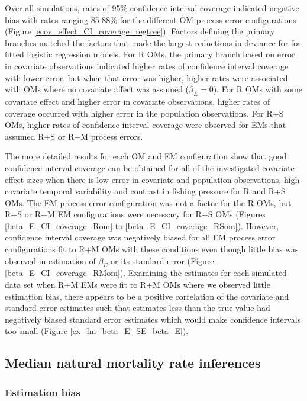 \documentclass[
  12pt,
]{article}
\begin{document}
Over all simulations, rates of 95\% confidence interval coverage indicated negative bias with rates ranging 85-88\% for the different OM process error configurations (Figure \ref{ecov_effect_CI_coverage_regtree}). Factors defining the primary branches matched the factors that made the largest reductions in deviance for for fitted logistic regression models. For R OMs, the primary branch based on error in covariate observations indicated higher rates of confidence interval coverage with lower error, but when that error was higher, higher rates were associated with OMs where no covariate affect was assumed (\(\beta_E = 0\)). For R OMs with some covariate effect and higher error in covariate observations, higher rates of coverage occurred with higher error in the population observations. For R+S OMs, higher rates of confidence interval coverage were observed for EMs that assumed R+S or R+M process errors.

The more detailed results for each OM and EM configuration show that good confidence interval coverage can be obtained for all of the investigated covariate effect sizes when there is low error in covariate and population observations, high covariate temporal variability and contrast in fishing pressure for R and R+S OMs. The EM process error configuration was not a factor for the R OMs, but R+S or R+M EM configurations were necessary for R+S OMs (Figures \ref{beta_E_CI_coverage_Rom} to \ref{beta_E_CI_coverage_RSom}). However, confidence interval coverage was negatively biased for all EM process error configurations fit to R+M OMs with these conditions even though little bias was observed in estimation of \(\beta_E\) or its standard error (Figure \ref{beta_E_CI_coverage_RMom}). Examining the estimates for each simulated data set when R+M EMs were fit to R+M OMs where we observed little estimation bias, there appears to be a positive correlation of the covariate and standard error estimates such that estimates less than the true value had negatively biased standard error estimates which would make confidence intervals too small (Figure \ref{ex_lm_beta_E_SE_beta_E}).

\subsection*{Median natural mortality rate inferences}\label{median-natural-mortality-rate-inferences}

\subsubsection*{Estimation bias}\label{estimation-bias-1}
\end{document}
